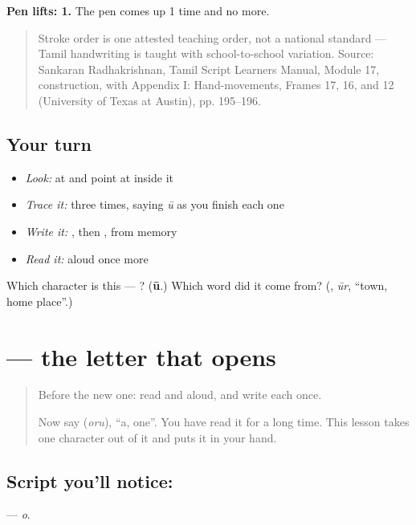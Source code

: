 \textbf{Pen lifts: 1.} The pen comes up 1 time and no more.

\begin{quote}
Stroke order is one attested teaching order, not a national standard — Tamil handwriting is taught with school-to-school variation. Source: Sankaran Radhakrishnan, Tamil Script Learners Manual, Module 17,  construction, with Appendix I: Hand-movements, Frames 17, 16, and 12 (University of Texas at Austin), pp. 195–196.
\end{quote}

\subsection*{Your turn}
\begin{itemize}
\raggedright
  \item \emph{Look:} at \textbf{} and point at  inside it
  \item \emph{Trace it:}  three times, saying \emph{ū} as you finish each one
  \item \emph{Write it:} , then , from memory
  \item \emph{Read it:} \textbf{} aloud once more
\end{itemize}

\begin{tcolorbox}[breakable,colback=teal!4,colframe=teal!35!black,title={Before you move on}]
Which character is this — ? (\textbf{ū}.) Which word did it come from? (\textbf{}, \emph{ūr}, \textquotedblleft{}town, home place\textquotedblright{}.)
\end{tcolorbox}
\section[\texorpdfstring{\ta{ஒ} (o)}{ஒ (o)}]{ — the letter that opens }

\label{lesson:TA-S139-letter-o}



\begin{quote}
Before the new one: read  and  aloud, and write each once.

Now say \textbf{} (\emph{oru}), \textquotedblleft{}a, one\textquotedblright{}. You have read it for a long time. This lesson takes one character out of it and puts it in your hand.
\end{quote}

\subsection*{Script you'll notice: }
\textbf{} — \emph{o}.

